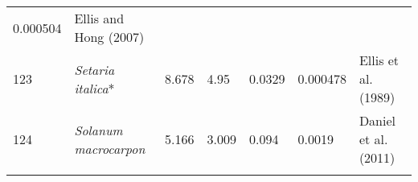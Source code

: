 \documentclass[]{article}
\begin{document}
\begin{longtable}[]{@{}lllllll@{}}
\begin{minipage}[t]{0.08\columnwidth}
0.000504\strut
\end{minipage} & \begin{minipage}[t]{0.23\columnwidth}\raggedright
Ellis and Hong (2007)\strut
\end{minipage}\tabularnewline
\begin{minipage}[t]{0.05\columnwidth}\raggedright
123\strut
\end{minipage} & \begin{minipage}[t]{0.23\columnwidth}\raggedright
\emph{Setaria italica}*\strut
\end{minipage} & \begin{minipage}[t]{0.05\columnwidth}\raggedright
8.678\strut
\end{minipage} & \begin{minipage}[t]{0.08\columnwidth}\raggedright
4.95\strut
\end{minipage} & \begin{minipage}[t]{0.08\columnwidth}\raggedright
0.0329\strut
\end{minipage} & \begin{minipage}[t]{0.08\columnwidth}\raggedright
0.000478\strut
\end{minipage} & \begin{minipage}[t]{0.23\columnwidth}\raggedright
Ellis et al. (1989)\strut
\end{minipage}\tabularnewline
\begin{minipage}[t]{0.05\columnwidth}\raggedright
124\strut
\end{minipage} & \begin{minipage}[t]{0.23\columnwidth}\raggedright
\emph{Solanum macrocarpon}\strut
\end{minipage} & \begin{minipage}[t]{0.05\columnwidth}\raggedright
5.166\strut
\end{minipage} & \begin{minipage}[t]{0.08\columnwidth}\raggedright
3.009\strut
\end{minipage} & \begin{minipage}[t]{0.08\columnwidth}\raggedright
0.094\strut
\end{minipage} & \begin{minipage}[t]{0.08\columnwidth}\raggedright
0.0019\strut
\end{minipage} & \begin{minipage}[t]{0.23\columnwidth}\raggedright
Daniel et al. (2011)\strut
\end{minipage}\tabularnewline
\begin{minipage}[t]{0.05\columnwidth}\raggedright

\end{minipage}
\end{longtable}
\end{document}
